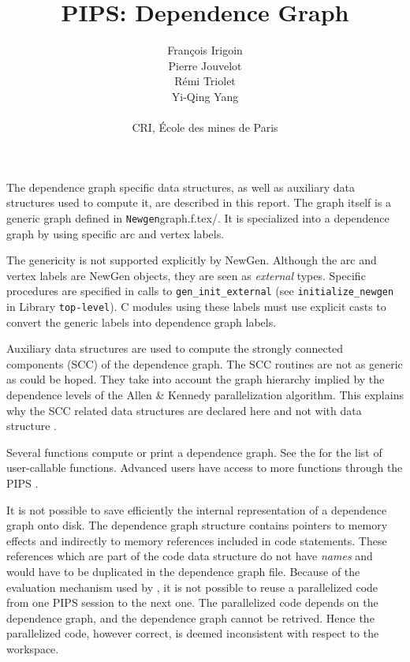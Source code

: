\documentclass[a4paper]{article}
\title{PIPS: Dependence Graph}
\author{Fran\c{c}ois Irigoin \\
    Pierre Jouvelot \\
    R\'emi Triolet\\
    Yi-Qing Yang \\
\\
    CRI, \'Ecole des mines de Paris}
\begin{document}
\maketitle


The dependence graph specific data structures, as well as auxiliary data
structures used to compute it, are described in this report. The graph
itself is a generic graph defined in \verb/Newgen/graph.f.tex/. It is
specialized into a dependence graph by using specific arc and vertex
labels. 

The genericity is not supported explicitly by NewGen\cite{JT89,JT90}. Although the arc
and vertex labels are NewGen objects, they are seen as {\em external}
types. Specific procedures are specified in calls to
\verb/gen_init_external/ (see \verb/initialize_newgen/ in Library
\verb/top-level/). C modules using these labels must use explicit
casts to convert the generic labels into dependence graph labels.

Auxiliary data structures are used to compute the strongly connected
components (SCC) of the dependence graph. The SCC routines are not as
generic as could be hoped. They take into account the graph hierarchy
implied by the dependence levels of the Allen \& Kennedy parallelization
algorithm. This explains why the SCC related data structures are declared
here and not with data structure
.

\begin{comment}
Les structures de donne'es suivantes sont utilise'es par la phase de
construction du graphe des de'pendances. Elles sont construites en
utilisant les structures de donne'es \verb+statement+ et \verb+effect+
qui ont e'te' de'finies dans la repre'sentation interne, ainsi que la
structure de donne'es ge'ne'riques \verb+vertex+ qui fait partie du
package \htmladdnormallink{{\em graph}}{http://www.cri.ensmp.fr/pips/graph}.
\end{comment}

Several functions compute or print a dependence graph. See the
 for the list of
user-callable functions. Advanced users have access to more functions
through the PIPS
.

It is not possible to save efficiently
the internal representation of a dependence graph onto disk. The
dependence graph structure contains pointers to memory effects and
indirectly to memory references included in code statements. These
references which are part of the code data structure do not have {\em
  names} and would have to be duplicated in the dependence graph
file. Because of the evaluation mechanism used by , it is not possible to
reuse a parallelized code from one PIPS session to the next one. The
parallelized code depends on the dependence graph, and the dependence
graph cannot be retrived. Hence the parallelized code, however correct, is
deemed inconsistent with respect to the workspace.
\end{document}
